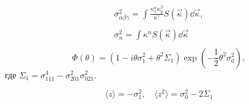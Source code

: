 \documentclass[10pt,pdf,hyperref={unicode}, dvipsnames]{beamer}
\newcommand{\mean}[1]{\langle#1\rangle}
\begin{document}
\begin{frame}[t]
\begin{figure}[h]
    \end{figure}    
    \begin{minipage}{0.45\linewidth}
        \footnotesize
        \begin{equation}
            \begin{gathered}
            \sigma^2_{\alpha \beta \gamma} =  \int\limits_{}
            \frac{\kappa_x^\alpha 
            \kappa_y^\beta}{\kappa^{\gamma}} S(\vec \kappa) \dd \vec \kappa,\\
            \sigma_n^2 = \int\limits_{}^{} \kappa^n S(\vec \kappa) \dd \vec \kappa 
            \end{gathered}
        \end{equation}
        \begin{equation}
            \label{eq:char}
            \Phi(\theta) = (1 - i \theta \sigma_1^2 + \theta^2 \Sigma_1)
            \exp(-\frac{1}{2} \theta^2 \sigma_0^2),
        \end{equation}
        где $\Sigma_1 = \sigma^4_{111} - \sigma_{201}^2 \sigma_{021}^2$.
    \end{minipage}
    \hfill
    \begin{minipage}{0.45\linewidth}
        \footnotesize
        \begin{equation}
            \mean{z} = - \sigma_1^2, \quad \mean{z^2} = \sigma_0^2 - 2 \Sigma_1
        \end{equation}
    \end{minipage}
\end{frame}
\end{document}

